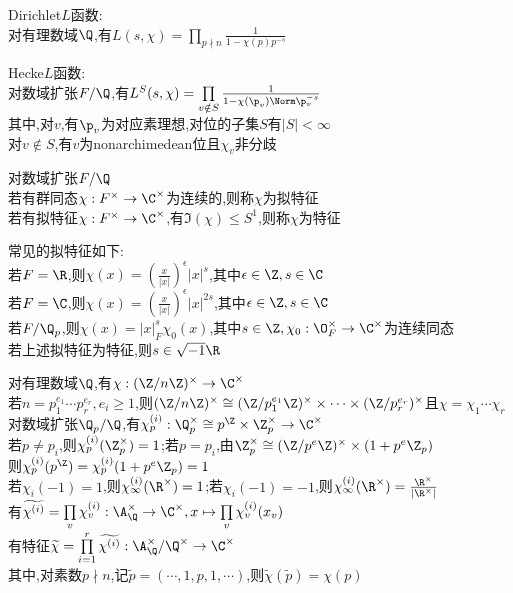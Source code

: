 \begin{dingyi}
Dirichlet$L$函数:\\
对有理数域$\Q$,有$L(s,\chi)=\prod\limits_{p\nmid n}\frac{1}{1-\chi(p)p^{-s}}$
\end{dingyi}

\begin{dingyi}
Hecke$L$函数:\\
对数域扩张$F/\Q$,有$L^{S}(s,\chi)=\prod\limits_{v\notin S}\frac{1}{1-\chi(\p_v)\Norm \p_v^{-s}}$\\
其中,对$v$,有$\p_v$为对应素理想,对位的子集$S$有$|S|<\infty$\\
对$v\notin S$,有$v$为nonarchimedean位且$\chi_v$非分歧
\end{dingyi}

\begin{dingyi}
对数域扩张$F/\Q$\\
若有群同态$\chi:F^{\times}\to\C^{\times}$为连续的,则称$\chi$为拟特征\\
若有拟特征$\chi:F^{\times}\to\C^{\times}$,有$\Im(\chi)\leq S^{1}$,则称$\chi$为特征
\end{dingyi}

\begin{zhu}
常见的拟特征如下:\\
若$F=\R$,则$\chi(x)=(\frac{x}{|x|})^{\epsilon}|x|^{s}$,其中$\epsilon\in \Z,s\in \C$\\
若$F=\C$,则$\chi(x)=(\frac{x}{|x|})^{\epsilon}|x|^{2s}$,其中$\epsilon\in \Z,s\in \C$\\
若$F/\Q_{p}$,则$\chi(x)=|x|_{F}^{s}\chi_{0}(x)$,其中$s\in \Z,\chi_{0}:\O_{F}^{\times}\to\C^{\times}$为连续同态\\
若上述拟特征为特征,则$s\in \sqrt{-1}\R$
\end{zhu}

\begin{dingli}
对有理数域$\Q$,有$\chi:(\Z/n\Z)^{\times}\to \C^{\times}$\\
若$n=p_1^{e_1}\cdots p_r^{e_r},e_i\geq 1$,则$(\Z/n\Z)^{\times}\cong(\Z/p_1^{e_1}\Z)^{\times}\times\cdots\times(\Z/p_r^{e_r})^{\times}$且$\chi=\chi_1\cdots\chi_r$\\
对数域扩张$\Q_{p}/\Q$,有$\chi_{p}^{(i)}:\Q_{p}^{\times}\cong p^{\Z}\times\Z_{p}^{\times}\to \C^{\times}$\\
若$p\neq p_i$,则$\chi_{p}^{(i)}(\Z_{p}^\times)=1$;若$p=p_i$,由$\Z_p^{\times}\cong(\Z/p^e\Z)^{\times}\times(1+p^e\Z_{p})$\\
则$\chi_{p}^{(i)}(p^{\Z})=\chi_{p}^{(i)}(1+p^e\Z_{p})=1$\\
若$\chi_i(-1)=1$,则$\chi_{\infty}^{(i)}(\R^{\times})=1$;若$\chi_i(-1)=-1$,则$\chi_{\infty}^{(i)}(\R^{\times})=\frac{\R^{\times}}{|\R^{\times}|}$\\
有$\widetilde{\chi^{(i)}}=\prod\limits_{v}\chi_{v}^{(i)}:\A_{\Q}^{\times}\to \C^{\times},x\mapsto\prod\limits_{v}\chi_v^{(i)}(x_v)$\\
有特征$\widetilde{\chi}=\prod\limits_{i=1}^{r}\widetilde{\chi^{(i)}}:\A_{\Q}^{\times}/\Q^{\times}\to \C^{\times}$\\
其中,对素数$p\nmid n$,记$\widetilde{p}=(\cdots,1,p,1,\cdots)$,则$\widetilde{\chi}(\widetilde{p})=\chi(p)$
\end{dingli}

